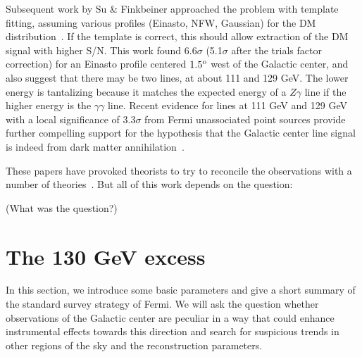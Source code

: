 \documentclass[aps,twocolumn,prd,superscriptaddress,showpacs,nofootinbib,fixfloat]{revtex4}
\newcommand{\degree}{^{\rm o}}
\begin{document}
Subsequent work by Su \& Finkbeiner approached the problem
with template fitting, assuming various profiles (Einasto,
NFW, Gaussian) for the DM distribution~\citep{linepaper}.
If the template is correct, this should allow extraction of
the DM signal with higher S/N.  This work found 6.6$\sigma$
(5.1$\sigma$ after the trials factor correction) for an
Einasto profile centered $1.5\degree$ west of the Galactic
center, and also suggest that there may be two lines, at
about 111 and 129 GeV.  The lower energy is tantalizing
because it matches the expected energy of a $Z\gamma$ line
if the higher energy is the $\gamma\gamma$ line.  Recent
evidence for lines at 111 GeV and 129 GeV with a local
significance of $3.3\sigma$ from Fermi unassociated point
sources provide further compelling support for the
hypothesis that the Galactic center line signal is indeed
from dark matter annihilation~\cite{doubleline}.

These papers have provoked theorists to try to reconcile the
observations with a number of theories~\citep{Dudas:2012,
Choi:2012, Kyae:2012, Lee:2012, Rajaraman:2012,
Acharya:2012, Garny:2012, Buckley:2012, Chu:2012, Kang:2012,
Buchmuller:2012, Heo:2012, Park:2012, Tulin:2012,
Cline:2012, Weiner:2012}.  But all of this work depends on
the question:

(What was the question?)



\section{The 130 GeV excess}
In this section, %
we introduce some basic parameters and give a short
summary of the standard survey strategy of Fermi. We will
ask the question whether observations of the Galactic center
are peculiar in a way that could enhance instrumental
effects towards this direction and search for suspicious trends in
other regions of the sky and the reconstruction parameters.

\end{document}
